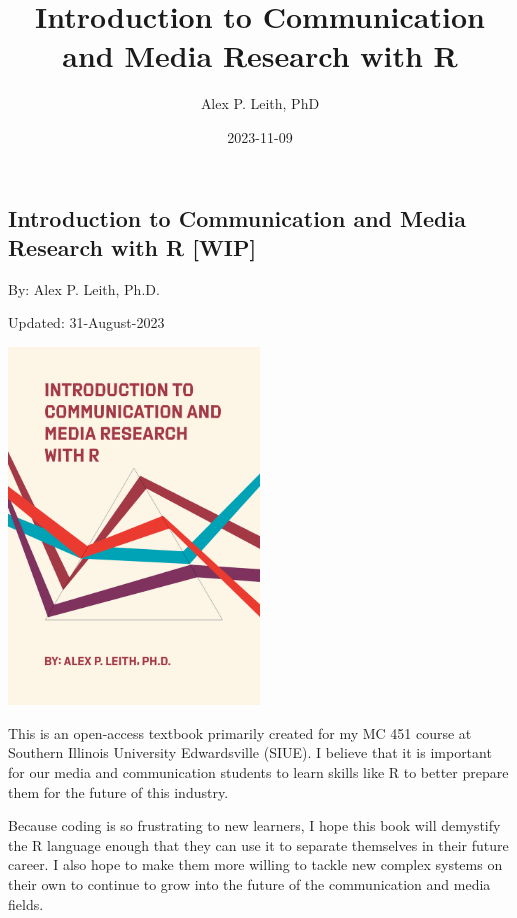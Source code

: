 \documentclass[
  b5paper]{book}
\title{Introduction to Communication and Media Research with R}
\author{Alex P. Leith, PhD}
\date{2023-11-09}
\begin{document}
\maketitle

{
\setcounter{tocdepth}{1}
\tableofcontents
}
\hypertarget{section}{%
\chapter*{}\label{section}}

\hypertarget{introduction-to-communication-and-media-research-with-r-wip}{%
\section*{Introduction to Communication and Media Research with R {[}WIP{]}}\label{introduction-to-communication-and-media-research-with-r-wip}}

By: Alex P. Leith, Ph.D.

Updated: 31-August-2023

\href{Current\%20Book\%20Cover\%20(Art\%20created\%20with\%20R\textquotesingle{}s\%20aRtsy\%20package)}{\includegraphics[width=0.5\textwidth,height=\textheight]{cover_2.png}}

This is an open-access textbook primarily created for my MC 451 course at Southern Illinois University Edwardsville (SIUE). I believe that it is important for our media and communication students to learn skills like R to better prepare them for the future of this industry.

Because coding is so frustrating to new learners, I hope this book will demystify the R language enough that they can use it to separate themselves in their future career. I also hope to make them more willing to tackle new complex systems on their own to continue to grow into the future of the communication and media fields.
\end{document}
